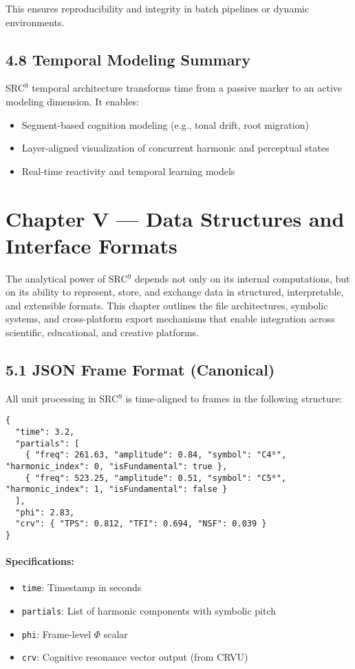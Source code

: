 \documentclass[10pt]{article}
\begin{document}
This ensures reproducibility and integrity in batch pipelines or dynamic environments.

\subsection*{4.8 Temporal Modeling Summary}

SRC$^9$ temporal architecture transforms time from a passive marker to an active modeling dimension. It enables:

\begin{itemize}
    \item Segment-based cognition modeling (e.g., tonal drift, root migration)
    \item Layer-aligned visualization of concurrent harmonic and perceptual states
    \item Real-time reactivity and temporal learning models
\end{itemize}

\section*{Chapter V — Data Structures and Interface Formats}

The analytical power of SRC$^{9}$ depends not only on its internal computations, but on its ability to represent, store, and exchange data in structured, interpretable, and extensible formats. This chapter outlines the file architectures, symbolic systems, and cross-platform export mechanisms that enable integration across scientific, educational, and creative platforms.

\subsection*{5.1 JSON Frame Format (Canonical)}

All unit processing in SRC$^{9}$ is time-aligned to frames in the following structure:

\begin{verbatim}
{
  "time": 3.2,
  "partials": [
    { "freq": 261.63, "amplitude": 0.84, "symbol": "C4⁰", "harmonic_index": 0, "isFundamental": true },
    { "freq": 523.25, "amplitude": 0.51, "symbol": "C5⁰", "harmonic_index": 1, "isFundamental": false }
  ],
  "phi": 2.83,
  "crv": { "TPS": 0.812, "TFI": 0.694, "NSF": 0.039 }
}
\end{verbatim}

\paragraph{Specifications:}
\begin{itemize}
    \item \texttt{time}: Timestamp in seconds
    \item \texttt{partials}: List of harmonic components with symbolic pitch
    \item \texttt{phi}: Frame-level $\Phi$ scalar
    \item \texttt{crv}: Cognitive resonance vector output (from CRVU)
\end{itemize}
\end{document}
